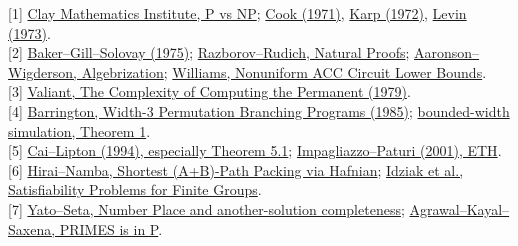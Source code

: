 \documentclass[11pt,letterpaper]{article}
\newcommand{\subh}[1]{\par\smallskip{\large\bfseries\color{teal}#1}\par\nobreak}
\newcommand{\source}[2]{\href{#1}{#2}}
\begin{document}
\subh{Sources and related work}
{\small
{[1]} \source{https://www.claymath.org/millennium/p-vs-np/}{Clay Mathematics Institute, P vs NP}; \source{https://doi.org/10.1145/800157.805047}{Cook (1971)}, \source{https://doi.org/10.1007/978-1-4684-2001-2_9}{Karp (1972)}, \source{https://www.mathnet.ru/eng/ppi914}{Levin (1973)}.\\
{[2]} \source{https://doi.org/10.1137/0204037}{Baker--Gill--Solovay (1975)}; \source{https://doi.org/10.1006/jcss.1997.1494}{Razborov--Rudich, Natural Proofs}; \source{https://www.scottaaronson.com/papers/alg.pdf}{Aaronson--Wigderson, Algebrization}; \source{https://people.csail.mit.edu/rrw/acc-lbs.pdf}{Williams, Nonuniform ACC Circuit Lower Bounds}.\\
{[3]} \source{https://doi.org/10.1016/0304-3975(79)90044-6}{Valiant, The Complexity of Computing the Permanent (1979)}.\\
{[4]} \source{https://people.cs.umass.edu/~barrington/publications/width3.pdf}{Barrington, Width-3 Permutation Branching Programs (1985)}; \source{https://people.cs.umass.edu/~barring/publications/bwbp.pdf}{bounded-width simulation, Theorem 1}.\\
{[5]} \source{https://doi.org/10.1137/S0097539790181336}{Cai--Lipton (1994), especially Theorem 5.1}; \source{https://doi.org/10.1006/jcss.2000.1727}{Impagliazzo--Paturi (2001), ETH}.\\
{[6]} \source{https://arxiv.org/abs/1603.08073}{Hirai--Namba, Shortest (A+B)-Path Packing via Hafnian}; \source{https://doi.org/10.4230/LIPIcs.ICALP.2022.127}{Idziak et al., Satisfiability Problems for Finite Groups}.\\
{[7]} \source{https://globals.ieice.org/en_transactions/fundamentals/10.1587/e86-a_5_1052/_p}{Yato--Seta, Number Place and another-solution completeness}; \source{https://annals.math.princeton.edu/2004/160-2/p12}{Agrawal--Kayal--Saxena, PRIMES is in P}.\\
}
\end{document}
